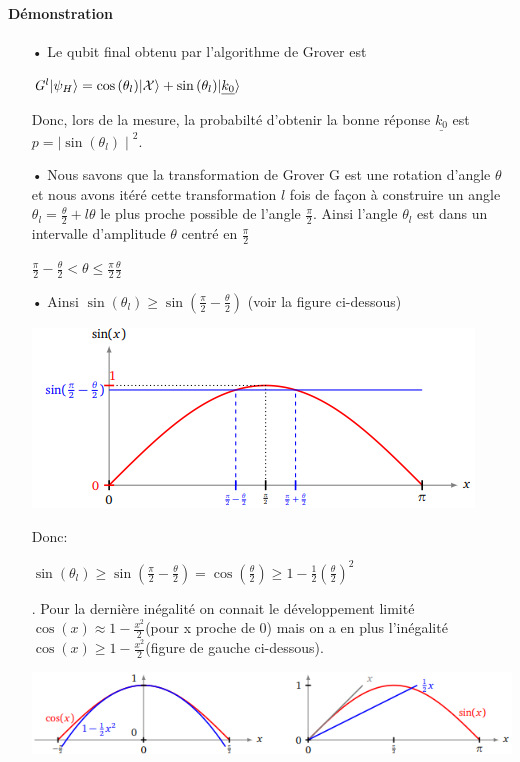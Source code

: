 \documentclass[12pt,openany]{report}
\DeclarePairedDelimiter\ket{\lvert}{\rangle}
\begin{document}
\paragraph{Démonstration\\}
\begin{itemize}
\item[•] Le qubit final obtenu par l'algorithme de Grover est 
\begin{center}
$\mathit{G}^{l}\ket{\psi_H}=\cos{(\theta_l)}\ket{\mathcal{X}}+ \sin{(\theta_l)}\ket{\underline{k_0}} $
\end{center}
Donc, lors de la mesure, la probabilté d'obtenir la bonne réponse $\underline{k_0} $ est $p= {\mid \sin{(\theta_l)}\mid}^2 $.
\item[•]  Nous savons que la transformation de Grover G est une rotation d’angle $\theta $ et nous avons itéré cette
transformation $ l$ fois de façon à construire un angle $ \theta_l = \frac{\theta}{2}+ l \theta $ le plus proche possible de l’angle $\frac{\pi}{2} $.
Ainsi l’angle $\theta_l$ est dans un intervalle d’amplitude $\theta $ centré en $ \frac{\pi}{2} $

\begin{center}
$ \frac{\pi}{2}-\frac{\theta}{2}< \theta \leq \frac{\pi}{2} \frac{\theta}{2}$
\end{center}

\item[•] Ainsi $\sin{(\theta_l)}\geq \sin{(\frac{\pi}{2}-\frac{\theta}{2})} $
(voir la figure ci-dessous)
\begin{center}
\includegraphics[scale=1.3]{./phase}
\end{center}
Donc: 
\begin{center}
$ \sin{(\theta_l)}\geq \sin{(\frac{\pi}{2}-\frac{\theta}{2})}=\cos{(\frac{\theta}{2})}\geq 1-\frac{1}{2}{(\frac{\theta}{2})}^2 $
\end{center}
.
Pour la dernière inégalité on connait le développement limité $\cos{(x)} \approx 1-\frac{x^{2}}{2}  $(pour x proche de 0) mais on a en plus l'inégalité $\cos{(x)}\geq 1-\frac{{x^2}}{2}   $(figure de gauche ci-dessous).
\begin{center}
\includegraphics[scale=1.2]{./phase_2}


\end{center}
\end{itemize}
\end{document}
